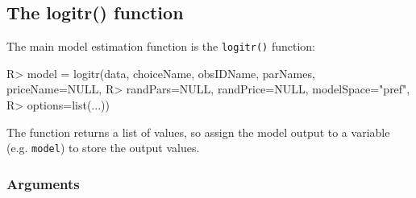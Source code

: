 \documentclass[article]{jss}
\begin{document}
\hypertarget{the-logitr-function}{%
\subsection{The logitr() function}\label{the-logitr-function}}

The main model estimation function is the \texttt{logitr()} function:

\begin{CodeChunk}

\begin{CodeInput}
R> model = logitr(data, choiceName, obsIDName, parNames, priceName=NULL,
R>             randPars=NULL, randPrice=NULL, modelSpace="pref",
R>             options=list(...))
\end{CodeInput}
\end{CodeChunk}

The function returns a list of values, so assign the model output to a
variable (e.g. \texttt{model}) to store the output values.

\hypertarget{arguments}{%
\subsubsection{Arguments}\label{arguments}}
\end{document}

